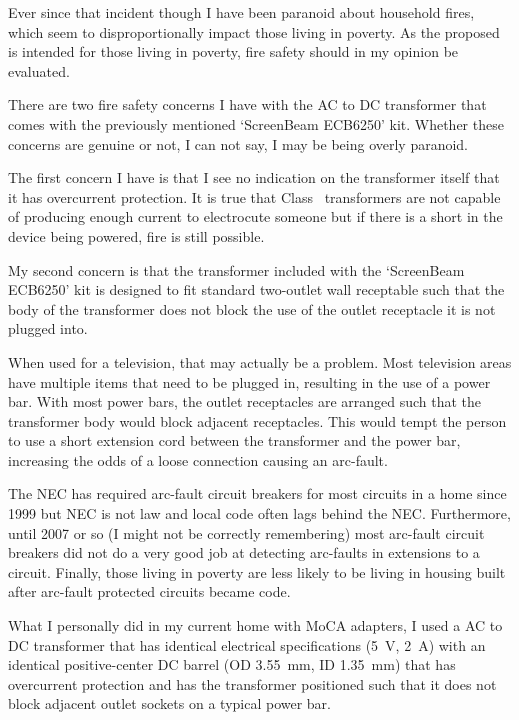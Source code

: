 Ever since that incident though I have been paranoid about household fires, which seem to disproportionally
impact those living in poverty. As the proposed  is intended for those living in
poverty, fire safety should in my opinion be evaluated.

There are two fire safety concerns I have with the AC to DC transformer that comes with the previously
mentioned `ScreenBeam ECB6250' kit. Whether these concerns are genuine or not, I can not say, I may
be being overly paranoid.

The first concern I have is that I see no indication on the transformer itself that it has overcurrent
protection. It is true that Class~ transformers are not capable of producing enough current to
electrocute someone but if there is a short in the device being powered, fire is still possible.

My second concern is that the transformer included with the `ScreenBeam ECB6250' kit is designed to fit
standard two-outlet wall receptable such that the body of the transformer does not block the use of
the outlet receptacle it is not plugged into.

When used for a television, that may actually be a problem. Most television areas have multiple items
that need to be plugged in, resulting in the use of a power bar. With most power bars, the outlet
receptacles are arranged such that the transformer body would block adjacent receptacles. This would
tempt the person to use a short extension cord between the transformer and the power bar, increasing
the odds of a loose connection causing an arc-fault.

The NEC has required arc-fault circuit breakers for most circuits in a home since 1999 but NEC is
not law and local code often lags behind the NEC. Furthermore, until 2007 or so (I might not be
correctly remembering) most arc-fault circuit breakers did not do a very good job at detecting
arc-faults in extensions to a circuit. Finally, those living in poverty are less likely to be
living in housing built after arc-fault protected circuits became code.

What I personally did in my current home with MoCA adapters, I used a
 AC to DC transformer that has identical
electrical specifications (\qty{5}{\volt}, \qty{2}{\ampere}) with an identical positive-center
DC barrel (OD \qty{3.55}{\milli\meter}, ID \qty{1.35}{\milli\meter}) that has overcurrent protection
and has the transformer positioned such that it does not block adjacent outlet sockets on a
typical power bar.

